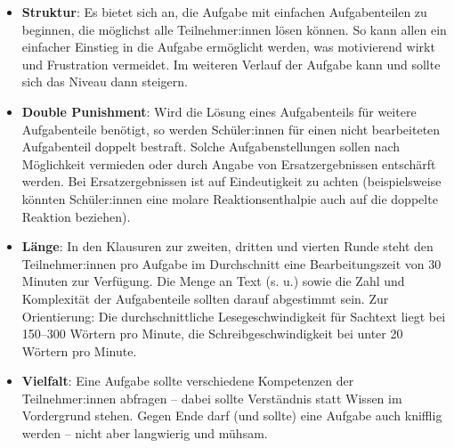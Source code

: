 \documentclass[./main.tex]{subfiles}
\begin{document}
\begin{itemize}
    \item \textbf{Struktur}: Es bietet sich an, die Aufgabe mit einfachen Aufgabenteilen zu beginnen, die m\"oglichst alle Teilnehmer:innen l\"osen k\"onnen. So kann allen ein einfacher Einstieg in die Aufgabe erm\"oglicht werden, was motivierend wirkt und Frustration vermeidet. Im weiteren Verlauf der Aufgabe kann und sollte sich das Niveau dann steigern. 
    \item \textbf{Double Punishment}: Wird die L\"osung eines Aufgabenteils f\"ur weitere Aufgabenteile ben\"otigt, so werden Sch\"uler:innen f\"ur einen nicht bearbeiteten Aufgabenteil doppelt bestraft. Solche Aufgabenstellungen sollen nach M\"oglichkeit vermieden oder durch Angabe von Ersatzergebnissen entsch\"arft werden. Bei Ersatzergebnissen ist auf Eindeutigkeit zu achten (beispielsweise k\"onnten Sch\"uler:innen eine molare Reaktionsenthalpie auch auf die doppelte Reaktion beziehen).
    \item \textbf{L\"ange}: In den Klausuren zur zweiten, dritten und vierten Runde steht den Teilnehmer:innen pro Aufgabe im Durchschnitt eine Bearbeitungszeit von 30 Minuten zur Verf\"ugung. Die Menge an Text (s. u.) sowie die Zahl und Komplexit\"at der Aufgabenteile sollten darauf abgestimmt sein. Zur Orientierung: Die durchschnittliche Lesegeschwindigkeit f\"ur Sachtext liegt bei 150--300 W\"ortern pro Minute, die Schreibgeschwindigkeit bei unter 20 W\"ortern pro Minute.
    \item \textbf{Vielfalt}: Eine Aufgabe sollte verschiedene Kompetenzen der Teilnehmer:innen abfragen -- dabei sollte Verst\"andnis statt Wissen im Vordergrund stehen. Gegen Ende darf (und sollte) eine Aufgabe auch knifflig werden -- nicht aber langwierig und m\"uhsam. 
\end{itemize}
\pagebreak
\end{document}
